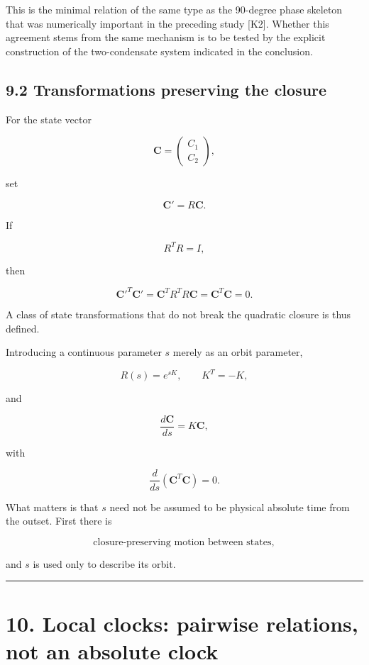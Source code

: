 \documentclass[
  a4paper,
]{article}
\begin{document}
This is the minimal relation of the same type as the 90-degree phase
skeleton that was numerically important in the preceding study {[}K2{]}.
Whether this agreement stems from the same mechanism is to be tested by
the explicit construction of the two-condensate system indicated in the
conclusion.

\subsection{9.2 Transformations preserving the
closure}\label{transformations-preserving-the-closure}

For the state vector

\[
\mathbf C=
\begin{pmatrix}
C_1\\
C_2
\end{pmatrix},
\]

set

\[
\mathbf C'=R\mathbf C.
\]

If

\[
R^TR=I,
\]

then

\[
{\mathbf C'}^T\mathbf C'
=
\mathbf C^TR^TR\mathbf C
=
\mathbf C^T\mathbf C
=
0.
\]

A class of state transformations that do not break the quadratic closure
is thus defined.

Introducing a continuous parameter \(s\) merely as an orbit parameter,

\[
R(s)=e^{sK},
\qquad K^T=-K,
\]

and

\[
\frac{d\mathbf C}{ds}=K\mathbf C,
\]

with

\[
\frac{d}{ds}
\left(
\mathbf C^T\mathbf C
\right)
=
0.
\]

What matters is that \(s\) need not be assumed to be physical absolute
time from the outset. First there is

\[
\boxed{
\text{closure-preserving motion between states}
},
\]

and \(s\) is used only to describe its orbit.

\begin{center}\rule{0.5\linewidth}{0.5pt}\end{center}

\section{10. Local clocks: pairwise relations, not an absolute
clock}\label{local-clocks-pairwise-relations-not-an-absolute-clock}
\end{document}
